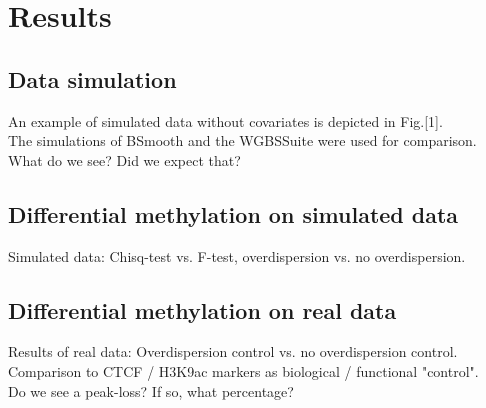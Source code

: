 \section{Results}

\subsection{Data simulation}
An example of simulated data without covariates is depicted in Fig.[1].\\
The simulations of BSmooth \cite{23034175} and the WGBSSuite \cite{25777524} were used for comparison.\\
What do we see? Did we expect that?

\subsection{Differential methylation on simulated data}
Simulated data: Chisq-test vs. F-test, overdispersion vs. no overdispersion.

\subsection{Differential methylation on real data}
Results of real data: Overdispersion control vs. no overdispersion control.\\
Comparison to CTCF / H3K9ac markers as biological / functional "control".\\
Do we see a peak-loss? If so, what percentage?
  
  
  
  
  
  